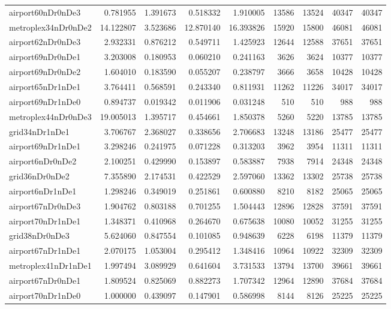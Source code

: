 \begin{longtable}{|l|r|r|r|r|r|r|r|r|}
airport60nDr0nDe3 & 0.781955 & 1.391673 & 0.518332 & 1.910005 & 13586 & 13524 & 40347 & 40347 \\
metroplex34nDr0nDe2 & 14.122807 & 3.523686 & 12.870140 & 16.393826 & 15920 & 15800 & 46081 & 46081 \\
airport62nDr0nDe3 & 2.932331 & 0.876212 & 0.549711 & 1.425923 & 12644 & 12588 & 37651 & 37651 \\
airport69nDr0nDe1 & 3.203008 & 0.180953 & 0.060210 & 0.241163 & 3626 & 3624 & 10377 & 10377 \\
airport69nDr0nDe2 & 1.604010 & 0.183590 & 0.055207 & 0.238797 & 3666 & 3658 & 10428 & 10428 \\
airport65nDr1nDe1 & 3.764411 & 0.568591 & 0.243340 & 0.811931 & 11262 & 11226 & 34017 & 34017 \\
airport69nDr1nDe0 & 0.894737 & 0.019342 & 0.011906 & 0.031248 & 510 & 510 & 988 & 988 \\
metroplex44nDr0nDe3 & 19.005013 & 1.395717 & 0.454661 & 1.850378 & 5260 & 5220 & 13785 & 13785 \\
grid34nDr1nDe1 & 3.706767 & 2.368027 & 0.338656 & 2.706683 & 13248 & 13186 & 25477 & 25477 \\
airport69nDr1nDe1 & 3.298246 & 0.241975 & 0.071228 & 0.313203 & 3962 & 3954 & 11311 & 11311 \\
airport6nDr0nDe2 & 2.100251 & 0.429990 & 0.153897 & 0.583887 & 7938 & 7914 & 24348 & 24348 \\
grid36nDr0nDe2 & 7.355890 & 2.174531 & 0.422529 & 2.597060 & 13362 & 13302 & 25738 & 25738 \\
airport6nDr1nDe1 & 1.298246 & 0.349019 & 0.251861 & 0.600880 & 8210 & 8182 & 25065 & 25065 \\
airport67nDr0nDe3 & 1.904762 & 0.803188 & 0.701255 & 1.504443 & 12896 & 12828 & 37591 & 37591 \\
airport70nDr1nDe1 & 1.348371 & 0.410968 & 0.264670 & 0.675638 & 10080 & 10052 & 31255 & 31255 \\
grid38nDr0nDe3 & 5.624060 & 0.847554 & 0.101085 & 0.948639 & 6228 & 6198 & 11379 & 11379 \\
airport67nDr1nDe1 & 2.070175 & 1.053004 & 0.295412 & 1.348416 & 10964 & 10922 & 32309 & 32309 \\
metroplex41nDr1nDe1 & 1.997494 & 3.089929 & 0.641604 & 3.731533 & 13794 & 13700 & 39661 & 39661 \\
airport67nDr0nDe1 & 1.809524 & 0.825069 & 0.882273 & 1.707342 & 12964 & 12890 & 37684 & 37684 \\
airport70nDr1nDe0 & 1.000000 & 0.439097 & 0.147901 & 0.586998 & 8144 & 8126 & 25225 & 25225 \\

\end{longtable}
